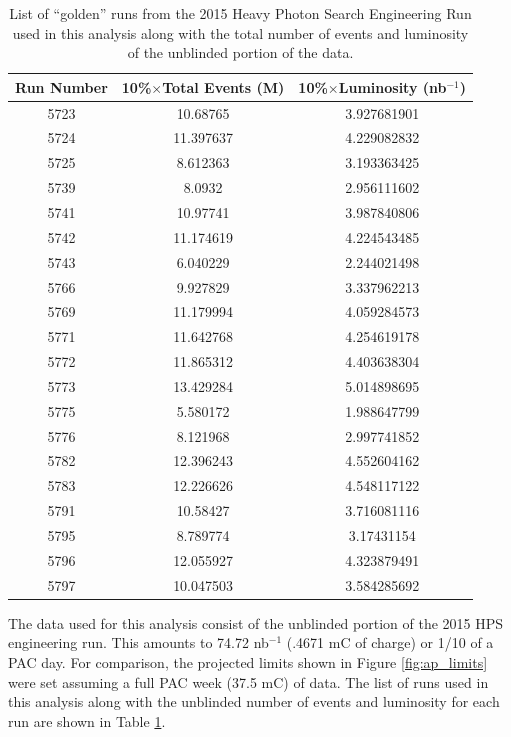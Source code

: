 \begin{table}[h!t]
    \centering
    \begin{tabular}{ccc}
        \toprule
        \textbf{Run Number} 
        & \textbf{10\%$\times$Total Events (M)} 
        & \textbf{10\%$\times$Luminosity (nb$^{-1}$)} \\
        \midrule
        \midrule
        5723 & 10.68765  & 3.927681901  \\
        5724 & 11.397637 & 4.229082832    \\
        5725 & 8.612363  & 3.193363425   \\
        5739 & 8.0932    & 2.956111602   \\
        5741 & 10.97741  & 3.987840806   \\
        5742 & 11.174619 & 4.224543485   \\
        5743 & 6.040229  & 2.244021498 \\
        5766 & 9.927829  & 3.337962213 \\
        5769 & 11.179994 & 4.059284573 \\
        5771 & 11.642768 & 4.254619178 \\
        5772 & 11.865312 & 4.403638304 \\
        5773 & 13.429284 & 5.014898695 \\
        5775 & 5.580172  & 1.988647799 \\
        5776 & 8.121968  & 2.997741852 \\
        5782 & 12.396243 & 4.552604162 \\
        5783 & 12.226626 & 4.548117122 \\
        5791 & 10.58427  & 3.716081116 \\
        5795 & 8.789774  & 3.17431154 \\
        5796 & 12.055927 & 4.323879491 \\
        5797 & 10.047503 & 3.584285692 \\ 
        \bottomrule
    \end{tabular}
    \caption{List of ``golden'' runs from the 2015 Heavy Photon Search 
             Engineering Run used in this analysis along with the total number
             of events and luminosity of the unblinded portion of the data.}
    \label{tab:data}
\end{table}

The data used for this analysis consist of the unblinded portion of the 2015 
HPS engineering run.  This amounts to 74.72 nb$^{-1}$ (.4671 mC of charge) or 
1/10 of a PAC day.  For comparison, the projected limits shown in Figure 
\ref{fig:ap_limits} were set assuming a full PAC week (37.5 mC) of data.
The list of runs used in this analysis along with the unblinded number of 
events and luminosity for each run are shown in Table \ref{tab:data}.

